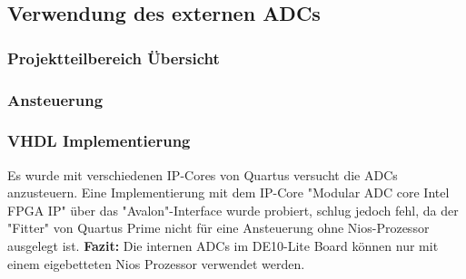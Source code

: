 \subsection{Verwendung des externen ADCs}
\subsubsection{Projektteilbereich Übersicht}
 
\subsubsection{Ansteuerung}

\subsubsection{VHDL Implementierung}
Es wurde mit verschiedenen IP-Cores von Quartus versucht die ADCs anzusteuern.  Eine Implementierung mit dem IP-Core "Modular ADC core Intel FPGA IP" über das "Avalon"-Interface wurde probiert, schlug jedoch fehl, da der "Fitter" von Quartus Prime nicht für eine Ansteuerung ohne Nios-Prozessor ausgelegt ist.
\textbf{Fazit:} Die internen ADCs im DE10-Lite Board können nur mit einem eigebetteten Nios Prozessor verwendet werden.